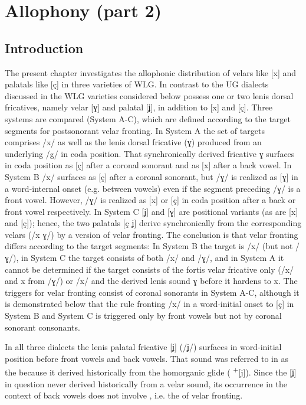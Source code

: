 \chapter{Allophony (part 2)}\label{sec:4}

\section{Introduction}\label{sec:4.1}

The present chapter investigates the allophonic distribution of velars like [x] and palatals like [ç] in three varieties of WLG. In contrast to the UG dialects discussed in  the WLG varieties considered below possess one or two lenis dorsal fricatives, namely velar [ɣ] and palatal [ʝ], in addition to [x] and [ç]. Three systems are compared (System A-C), which are defined according to the target segments for postsonorant velar fronting. In System A the set of targets comprises /x/ as well as the lenis dorsal fricative ({\textbar}ɣ{\textbar}) produced from an underlying /g/ in coda position. That synchronically derived fricative {\textbar}ɣ{\textbar} surfaces in coda position as [ç] after a coronal sonorant and as [x] after a back vowel. In System B /x/ surfaces as [ç] after a coronal sonorant, but /ɣ/ is realized as [ɣ] in a word-internal onset (e.g. between vowels) even if the segment preceding /ɣ/ is a front vowel. However, /ɣ/ is realized as [x] or [ç] in coda position after a back or front vowel respectively. In System C [ʝ] and [ɣ] are positional variants (as are [x] and [ç]); hence, the two palatals [ç ʝ] derive synchronically from the corresponding velars (/x ɣ/) by a version of velar fronting. The conclusion is that velar fronting differs according to the target segments: In System B the target is /x/ (but not /ɣ/), in System C the target consists of both /x/ and /ɣ/, and in System A it cannot be determined if the target consists of the fortis velar fricative only (/x/ and {\textbar}x{\textbar} from /ɣ/) or /x/ and the derived lenis sound {\textbar}ɣ{\textbar} before it hardens to {\textbar}x{\textbar}. The triggers for velar fronting consist of coronal sonorants in System A-C, although it is demonstrated below that the rule fronting /x/ in a word-initial onset to [ç] in System B and System C is triggered only by front vowels but not by coronal sonorant consonants.

In all three dialects the lenis palatal fricative [ʝ] (/ʝ/) surfaces in word-initial position before front vowels and back vowels. That sound was referred to in  as the  because it derived historically from the homorganic glide ( \textsuperscript{+}[j]). Since the [ʝ] in question never derived historically from a velar sound, its occurrence in the context of back vowels does not involve , i.e. the  of velar fronting.

